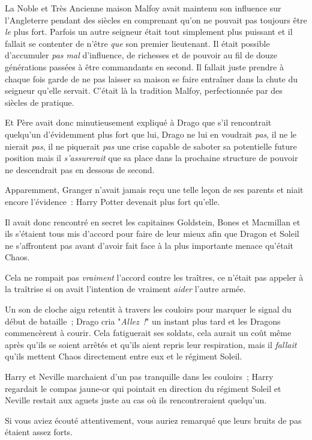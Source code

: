 La Noble et Très Ancienne maison Malfoy avait maintenu son influence sur l'Angleterre pendant des siècles en comprenant qu'on ne pouvait pas toujours être \emph{le} plus fort. Parfois un autre seigneur était tout simplement plus puissant et il fallait se contenter de n'être \emph{que} son premier lieutenant. Il était possible d'accumuler \emph{pas mal} d'influence, de richesses et de pouvoir au fil de douze générations passées à être commandants en second. Il fallait juste prendre à chaque fois garde de ne pas laisser sa maison se faire entraîner dans la chute du seigneur qu'elle servait. C'était là la tradition Malfoy, perfectionnée par des siècles de pratique.

Et Père avait donc minutieusement expliqué à Drago que s'il rencontrait quelqu'un d'évidemment plus fort que lui, Drago ne lui en voudrait \emph{pas}, il ne le nierait \emph{pas}, il ne piquerait \emph{pas} une crise capable de saboter sa potentielle future position mais il \emph{s'assurerait} que sa place dans la prochaine structure de pouvoir ne descendrait pas en dessous de second.

Apparemment, Granger n'avait jamais reçu une telle leçon de ses parents et niait encore l'évidence~: Harry Potter devenait plus fort qu'elle.

Il avait donc rencontré en secret les capitaines Goldstein, Bones et Macmillan et ils s'étaient tous mis d'accord pour faire de leur mieux afin que Dragon et Soleil ne s'affrontent pas avant d'avoir fait face à la plus importante menace qu'était Chaos.

Cela ne rompait pas \emph{vraiment} l'accord contre les traîtres, ce n'était pas appeler à la traîtrise si on avait l'intention de vraiment \emph{aider} l'autre armée.

Un son de cloche aigu retentit à travers les couloirs pour marquer le signal du début de bataille~; Drago cria "\emph{Allez~!}" un instant plus tard et les Dragons commencèrent à courir. Cela fatiguerait ses soldats, cela aurait un coût même après qu'ils se soient arrêtés et qu'ils aient repris leur respiration, mais il \emph{fallait} qu'ils mettent Chaos directement entre eux et le régiment Soleil.

\later

Harry et Neville marchaient d'un pas tranquille dans les couloirs~; Harry regardait le compas jaune-or qui pointait en direction du régiment Soleil et Neville restait aux aguets juste au cas où ils rencontreraient quelqu'un.

Si vous aviez écouté attentivement, vous auriez remarqué que leurs bruits de pas étaient assez forts.

